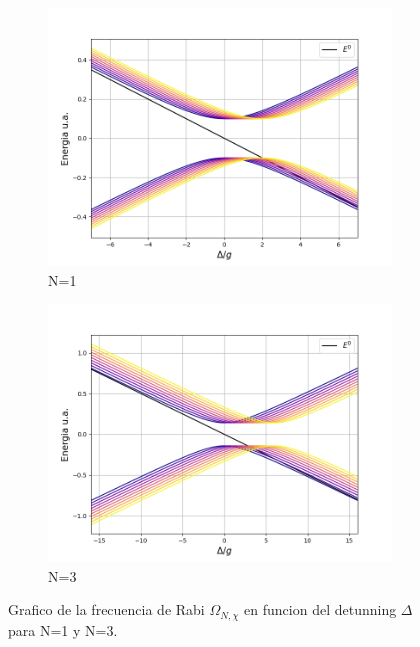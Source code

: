 \begin{figure}[H]
    \centering
    \begin{subfigure}[h]{0.49\textwidth}
        \centering
        \includegraphics[width=\textwidth]{figuras/ch3/relacion energia detunning jcm simple kerr.png}
        \caption{N=1}
        \label{fig3:relacion energia detunning kerr 1}
    \end{subfigure}
    \hfill
    \begin{subfigure}[h]{0.49\textwidth}
        \centering
        \includegraphics[width=\textwidth]{figuras/ch3/relacion energia detunning jcm simple kerr 2.png}
        \caption{N=3}
        \label{fig3:relacion energia detunning kerr 2}
    \end{subfigure}
    \caption{Grafico de la frecuencia de Rabi $\Omega_{N,\chi}$ en funcion del detunning $\Delta$ para N=1 y N=3.}
    \label{fig3:relacion energia detunning kerr}
\end{figure}


